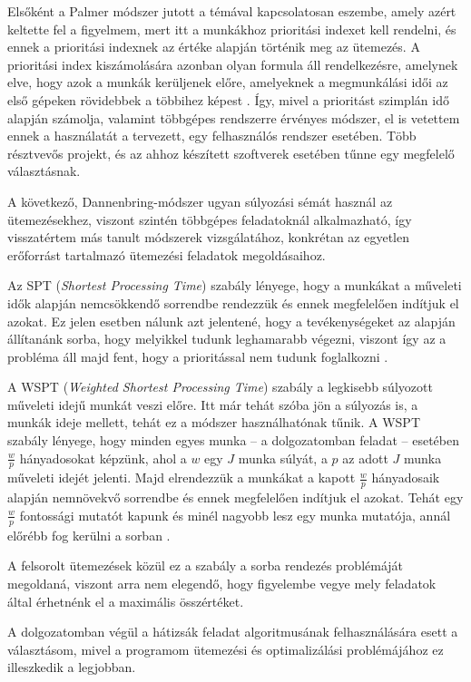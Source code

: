 
Elsőként a Palmer módszer jutott a témával kapcsolatosan eszembe, amely azért keltette fel a figyelmem, mert itt a munkákhoz prioritási indexet kell rendelni, és ennek a prioritási indexnek az értéke alapján történik meg az ütemezés. A prioritási index kiszámolására azonban olyan formula áll rendelkezésre, amelynek elve, hogy azok a munkák kerüljenek előre, amelyeknek a megmunkálási idői az első gépeken rövidebbek a többihez képest \cite{palmer}. Így, mivel a prioritást szimplán idő alapján számolja, valamint többgépes rendszerre érvényes módszer, el is vetettem ennek a használatát a tervezett, egy felhasználós rendszer esetében. Több résztvevős projekt, és az ahhoz készített szoftverek esetében tűnne egy megfelelő választásnak.


A következő, Dannenbring-módszer ugyan súlyozási sémát használ az ütemezésekhez, viszont szintén többgépes feladatoknál alkalmazható, így visszatértem más tanult módszerek vizsgálatához, konkrétan az egyetlen erőforrást tartalmazó ütemezési feladatok megoldásaihoz.


Az SPT (\textit{Shortest Processing Time}) szabály lényege, hogy a munkákat a műveleti idők alapján nemcsökkendő sorrendbe rendezzük és ennek megfelelően indítjuk el azokat. Ez jelen esetben nálunk azt jelentené, hogy a tevékenységeket az alapján állítanánk sorba, hogy melyikkel tudunk leghamarabb végezni, viszont így az a probléma áll majd fent, hogy a prioritással nem tudunk foglalkozni \cite{sptwspt}.


A WSPT (\textit{Weighted Shortest Processing Time}) szabály a legkisebb súlyozott műveleti idejű munkát veszi előre. Itt már tehát szóba jön a súlyozás is, a munkák ideje mellett, tehát ez a módszer használhatónak tűnik. A WSPT szabály lényege, hogy minden egyes munka -- a dolgozatomban feladat -- esetében $\frac{w}{p}$ hányadosokat képzünk, ahol a $w$ egy $J$ munka súlyát, a $p$ az adott $J$ munka műveleti idejét jelenti. Majd elrendezzük a munkákat a kapott $\frac{w}{p}$ hányadosaik alapján nemnövekvő sorrendbe és ennek megfelelően indítjuk el azokat.
Tehát egy $\frac{w}{p}$ fontossági mutatót kapunk és minél nagyobb lesz egy munka mutatója, annál előrébb fog kerülni a sorban \cite{sptwspt}.

A felsorolt ütemezések közül ez a szabály a sorba rendezés problémáját megoldaná, viszont arra nem elegendő, hogy figyelembe vegye mely feladatok által érhetnénk el a maximális összértéket.

A dolgozatomban végül a hátizsák feladat algoritmusának felhasználására esett a választásom, mivel a programom ütemezési és optimalizálási problémájához ez illeszkedik a legjobban.

